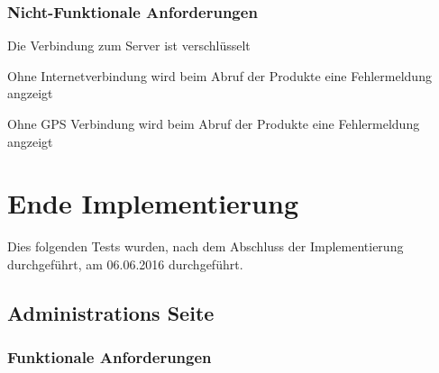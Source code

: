 \subsubsection{Nicht-Funktionale Anforderungen}
\begin{todolist}
	\item[\xmark] Die Verbindung zum Server ist verschlüsselt
	\item[\xmark] Ohne Internetverbindung wird beim Abruf der Produkte eine Fehlermeldung angzeigt
	\item[\xmark] Ohne GPS Verbindung wird beim Abruf der Produkte eine Fehlermeldung angzeigt
\end{todolist}



\section{Ende Implementierung}

Dies folgenden Tests wurden, nach dem Abschluss der Implementierung durchgeführt, am 06.06.2016 durchgeführt.

\subsection{Administrations Seite}
\subsubsection{Funktionale Anforderungen}

